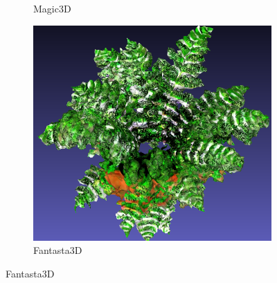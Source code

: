 \begin{figure}[ht]
\begin{subfigure}[b]{0.35\textwidth}
        \caption{Magic3D}
        \vspace{0.1cm}
    \end{subfigure}
    \begin{subfigure}[b]{0.32\textwidth}
        \centering
        \includegraphics[width=\textwidth]{etc/a high-quality rendering of a fern in a wooden pot/fantasia3d/fantasia_fern_result.png}
        \caption{Fantasta3D}
        \vspace{0.1cm}
    \end{subfigure}


\end{figure}
